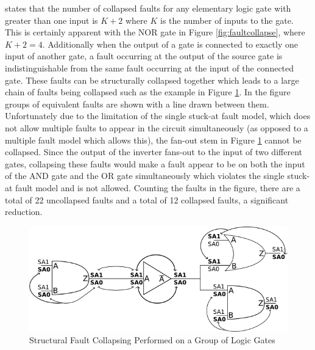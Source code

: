 \documentclass[12pt]{report}
\begin{document}
\cite{stroud} states that the number of collapsed faults for any elementary logic gate with greater than one input is $K+2$ where $K$ is the number of inputs to the gate.  This is certainly apparent with the NOR gate in Figure \ref{fig:faultcollapse}, where $K+2=4$.  Additionally when the output of a gate is connected to exactly one input of another gate, a fault occurring at the output of the source gate is indistinguishable from the same fault occurring at the input of the connected gate\cite{stroud}.  These faults can be structurally collapsed together which leads to a large chain of faults being collapsed such as the example in Figure \ref{fig:collapsechain}\cite{stroud}.  In the figure groups of equivalent faults are shown with a line drawn between them.  Unfortunately due to the limitation of the single stuck-at fault model, which does not allow multiple faults to appear in the circuit simultaneously (as opposed to a multiple fault model which allows this), the fan-out stem in Figure \ref{fig:collapsechain} cannot be collapsed\cite{defectforcmos}.  Since the output of the inverter fans-out to the input of two different gates, collapsing these faults would make a fault appear to be on both the input of the AND gate and the OR gate simultaneously which violates the single stuck-at fault model and is not allowed\cite{defectforcmos}.  Counting the faults in the figure, there are a total of 22 uncollapsed faults and a total of 12 collapsed faults, a significant reduction.
\begin{figure}
	\begin{center}
		\includegraphics[scale=1]{images/faultchain-collapse}
	\end{center}
  \caption{Structural Fault Collapsing Performed on a Group of Logic Gates}
  \label{fig:collapsechain}
\end{figure}
\end{document}
